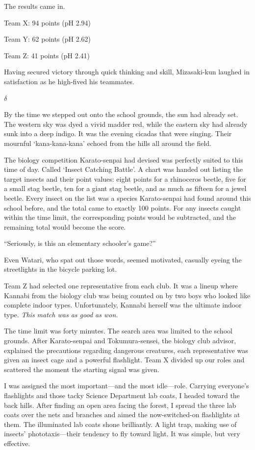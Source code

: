 \documentclass[
    a4paper,
    12pt,
    twoside,
    openany,
    UTF8,
    fontset=windows
]{ctexbook}
\begin{document}
The results came in.

\begin{center}
Team X: 94 points (pH 2.94)

Team Y: 62 points (pH 2.62)

Team Z: 41 points (pH 2.41)
\end{center}

Having secured victory through quick thinking and skill, Mizasaki-kun laughed in satisfaction as he high-fived his teammates.

$\delta$

By the time we stepped out onto the school grounds, the sun had already set. The western sky was dyed a vivid madder red, while the eastern sky had already sunk into a deep indigo. It was the evening cicadas that were singing. Their mournful `kana-kana-kana' echoed from the hills all around the field.

The biology competition Karato-senpai had devised was perfectly suited to this time of day. Called `Insect Catching Battle'. A chart was handed out listing the target insects and their point values: eight points for a rhinoceros beetle, five for a small stag beetle, ten for a giant stag beetle, and as much as fifteen for a jewel beetle. Every insect on the list was a species Karato-senpai had found around this school before, and the total came to exactly 100 points. For any insects caught within the time limit, the corresponding points would be subtracted, and the remaining total would become the score.

``Seriously, is this an elementary schooler's game?''

Even Watari, who spat out those words, seemed motivated, casually eyeing the streetlights in the bicycle parking lot.

Team Z had selected one representative from each club. It was a lineup where Kannabi from the biology club was being counted on by two boys who looked like complete indoor types. Unfortunately, Kannabi herself was the ultimate indoor type. \textit{This match was as good as won.}

The time limit was forty minutes. The search area was limited to the school grounds. After Karato-senpai and Tokumura-sensei, the biology club advisor, explained the precautions regarding dangerous creatures, each representative was given an insect cage and a powerful flashlight. Team X divided up our roles and scattered the moment the starting signal was given.

I was assigned the most important---and the most idle---role. Carrying everyone's flashlights and those tacky Science Department lab coats, I headed toward the back hills. After finding an open area facing the forest, I spread the three lab coats over the nets and branches and aimed the now-switched-on flashlights at them. The illuminated lab coats shone brilliantly. A light trap, making use of insects' phototaxis---their tendency to fly toward light. It was simple, but very effective.
\end{document}
